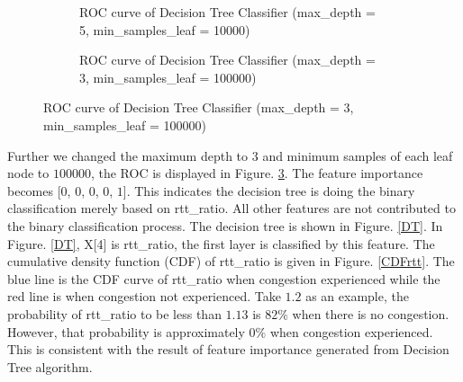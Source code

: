 \begin{figure}[!htb]\centering
   \begin{subfigure}{0.49\textwidth}
\caption{ROC curve of Decision Tree Classifier (max\_depth = 5, min\_samples\_leaf = 10000)}
\label{DecisionTreeRoc}

   \end{subfigure}
   \begin {subfigure}{0.49\textwidth}
\caption{ROC curve of Decision Tree Classifier (max\_depth = 3, min\_samples\_leaf = 100000)}
\label{DTRoc}
   \end{subfigure}
\end{figure}
Further we changed the maximum depth to $3$ and minimum samples of each leaf node to $100000$, the ROC is displayed in Figure. \ref{DTRoc}. The feature importance becomes [$0$, $0$, $0$, $0$, $1$]. This indicates the decision tree is doing the binary classification merely based on rtt\_ratio. All other features are not contributed to the binary classification process. 
The decision tree is shown in Figure. \ref{DT}. In Figure. \ref{DT}, X[4] is rtt\_ratio, the first layer is classified by this feature. The cumulative density function (CDF) of rtt\_ratio is given in Figure. \ref{CDFrtt}. The blue line is the CDF curve of rtt\_ratio when congestion experienced while the red line is when congestion not experienced. Take $1.2$ as an example, the probability of rtt\_ratio to be less than $1.13$ is $82\%$ when there is no congestion. However, that probability is approximately $0\%$ when congestion experienced. This is consistent with the result of feature importance generated from Decision Tree algorithm. 

